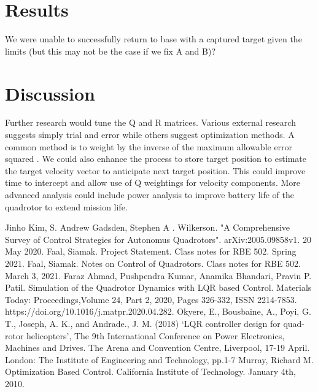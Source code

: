\documentclass{article}
\begin{document}
\begin{multicols}{2}
\section*{Results}
We were unable to successfully return to base with a captured target given the limits (but this may not be the case if we fix A and B)?
\section*{Discussion}
Further research would tune the Q and R matrices.  Various external research suggests simply trial and error while others suggest optimization methods. A common method is to weight by the inverse of the maximum allowable error squared \cite{mur}.  We could also enhance the process to store target position to estimate the target velocity vector to anticipate next target position.  This could improve time to intercept and allow use of Q weightings for velocity components. More advanced analysis could include power analysis to improve battery life of the quadrotor to extend mission life.
\label{References}

\begin{thebibliography}{10}
Jinho Kim, S. Andrew Gadsden, Stephen A . Wilkerson.
"A Comprehensive Survey of Control Strategies for Autonomus Quadrotors".
arXiv:2005.09858v1.
20 May 2020.
Faal, Siamak. Project Statement.  Class notes for RBE 502. Spring 2021.
Faal, Siamak. Notes on Control of Quadrotors. Class notes for RBE 502. March 3, 2021.
Faraz Ahmad, Pushpendra Kumar, Anamika Bhandari, Pravin P. Patil.
Simulation of the Quadrotor Dynamics with LQR based Control.
Materials Today: Proceedings,Volume 24, Part 2, 2020, Pages 326-332,
ISSN 2214-7853.
https://doi.org/10.1016/j.matpr.2020.04.282.
Okyere, E., Bousbaine, A., Poyi, G. T., Joseph, A. K., and Andrade.,
J. M. (2018) ‘LQR controller design for quad-rotor helicopters’,
The 9th International Conference on Power Electronics, Machines
and Drives. The Arena and Convention Centre, Liverpool, 17-19
April. London: The Institute of Engineering and Technology, pp.1-7
Murray, Richard M. Optimization Based Control.  California Institute of Technology. January 4th, 2010.




\end{thebibliography}

\end{multicols}
\end{document}
